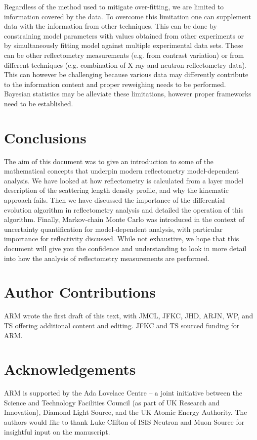 \documentclass[
 reprint,
 superscriptaddress,
 amsmath,amssymb,
 aps,
]{revtex4-1}
\begin{document}
Regardless of the method used to mitigate over-fitting, we are limited to information covered by the data. 
To overcome this limitation one can supplement data with the information from other techniques. 
This can be done by constraining model parameters with values obtained from other experiments or by simultaneously fitting model against multiple experimental data sets. 
These can be other reflectometry measurements (e.g. from contrast variation) or from different techniques (e.g. combination of X-ray and neutron reflectometry data). 
This can however be challenging because various data may differently contribute to the information content and proper reweighing needs to be performed. 
Bayesian statistics may be alleviate these limitations, however proper frameworks need to be established.   
 
\section{Conclusions}
The aim of this document was to give an introduction to some of the mathematical concepts that underpin modern reflectometry model-dependent analysis.
We have looked at how reflectometry is calculated from a layer model description of the scattering length density profile, and why the kinematic approach fails.
Then we have discussed the importance of the differential evolution algorithm in reflectometry analysis and detailed the operation of this algorithm.
Finally, Markov-chain Monte Carlo was introduced in the context of uncertainty quantification for model-dependent analysis, with particular importance for reflectivity discussed.
While not exhaustive, we hope that this document will give you the confidence and understanding to look in more detail into how the analysis of reflectometry measurements are performed.

\section*{Author Contributions}
ARM wrote the first draft of this text, with JMCL, JFKC, JHD, ARJN, WP, and TS offering additional content and editing.
JFKC and TS sourced funding for ARM.


\section*{Acknowledgements}
ARM is supported by the Ada Lovelace Centre -- a joint initiative between the Science and Technology Facilities Council (as part of UK Research and Innovation), Diamond Light Source, and the UK Atomic Energy Authority.
The authors would like to thank Luke Clifton of ISIS Neutron and Muon Source for insightful input on the manuscript.




\end{document}
